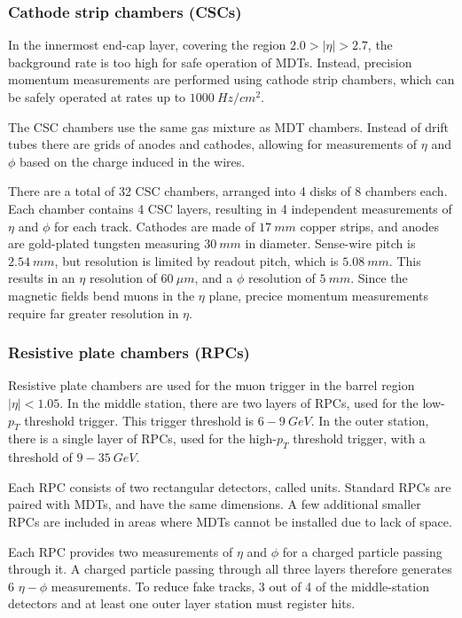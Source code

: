 \subsubsection{Cathode strip chambers (CSCs)}

In the innermost end-cap layer, covering the region $2.0 > |\eta| > 2.7$,
the background rate is too high for safe operation of MDTs.
Instead, precision momentum measurements are performed using cathode strip chambers,
which can be safely operated at rates up to $1000~Hz/cm^2$\cite{atlas-detector-2008}.

The CSC chambers use the same gas mixture as MDT chambers.
Instead of drift tubes there are grids of anodes and cathodes, allowing for measurements of $\eta$ and $\phi$ based on
the charge induced in the wires.

There are a total of 32 CSC chambers, arranged into 4 disks of 8 chambers each.
Each chamber contains 4 CSC layers, resulting in 4 independent measurements of $\eta$ and $\phi$ for each track.
Cathodes are made of $17~mm$ copper strips, and anodes are gold-plated tungsten measuring $30~mm$ in diameter.
Sense-wire pitch is $2.54~mm$, but resolution is limited by readout pitch, which is $5.08~mm$.
This results in an $\eta$ resolution of $60~\mu m$, and a $\phi$ resolution of $5~mm$.\cite{muon-2003}
Since the magnetic fields bend muons in the $\eta$ plane, precice momentum measurements require far greater resolution in $\eta$.

\subsubsection{Resistive plate chambers (RPCs)}

Resistive plate chambers are used for the muon trigger in the barrel region $|\eta| < 1.05$.
In the middle station, there are two layers of RPCs, used for the low-$p_T$ threshold trigger.
This trigger threshold is $6-9~GeV$.
In the outer station, there is a single layer of RPCs, used for the high-$p_T$ threshold trigger,
with a threshold of $9-35~GeV$.

Each RPC consists of two rectangular detectors, called units.
Standard RPCs are paired with MDTs, and have the same dimensions.
A few additional smaller RPCs are included in areas where MDTs cannot be installed due to lack of space.

Each RPC provides two measurements of $\eta$ and $\phi$ for a charged particle passing through it.
A charged particle passing through all three layers therefore generates 6 $\eta-\phi$ measurements.
To reduce fake tracks, 3 out of 4 of the middle-station detectors and at least one outer layer station must register hits.


